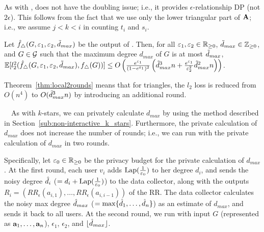 As with ,  does not have the doubling issue; i.e., it provides $\epsilon$-relationship DP (not $2\epsilon$). 
This follows from the fact that we 
use only the lower triangular part of $\mathbf{A}$; 
i.e., we assume 
$j<k<i$ 
in counting $t_i$ and $s_i$. 

\begin{theorem}\label{thm:local2rounds}
  Let 
  $\hat{f}_{\triangle}(G, \varepsilon_1, \varepsilon_2, \tilde{d}_{max})$ 
  be the output of 
  . 
  Then, for all 
  $\varepsilon_1,\varepsilon_2 \in \mathbb{R}_{\ge0}$, 
  $\tilde{d}_{max} \in \mathbb{Z}_{\ge0}$,
  and $G\in \mathcal{G}$ such that the
  maximum degree $d_{max}$ of $G$ is 
  at most 
  $\tilde{d}_{max}$,
  $\mathbb{E}[l_2^2(\hat{f}_{\triangle}(G, \varepsilon_1, \varepsilon_2, \tilde{d}_{max}), f_\triangle(G))] 
  \leq
    O\left(\frac{e^{\varepsilon_1}}{(1-e^{\varepsilon_1})^2} \left(\tilde{d}_{max}^3 n +
    \frac{e^{\varepsilon_1}}{\varepsilon_2^2}\tilde{d}_{max}^2 n\right)\right)$.
\end{theorem}

Theorem~\ref{thm:local2rounds} means that for triangles, the $l_2$ loss 
is reduced from $O(n^4)$ to $O(\tilde{d}_{max}^3n)$ by introducing an additional round. 


\smallskip
{}~~As with $k$-stars, we can privately calculate $d_{max}$ 
by using the method described in Section~\ref{sub:non-interactive_k_stars}. 
Furthermore, the private calculation of $d_{max}$ does not increase the number of rounds; i.e., we can run  with the private calculation of $d_{max}$ in two rounds. 

Specifically, let $\varepsilon_0 \in \mathbb{R}_{\ge0}$ be the privacy budget for the private calculation of $d_{max}$. 
At the first round, each user $v_i$ adds $\textrm{Lap}(\frac{1}{\varepsilon_0})$ to her degree $d_i$, 
and sends the noisy degree $\hat{d}_i$ ($=d_i + \textrm{Lap}(\frac{1}{\varepsilon_0})$) to the data collector, along with the outputs $R_i = (RR_\epsilon(a_{i,1}), \ldots, RR_\epsilon(a_{i,i-1}))$ of the RR. 
The data collector calculates the noisy max degree $\hat{d}_{max}$ ($= \max\{\hat{d}_1,
\ldots, \hat{d}_n\}$) as an estimate of $d_{max}$, and sends it back to all users. 
At the second round, we run  with input $G$ (represented as $\mathbf{a}_1, \ldots, \mathbf{a}_n$), $\epsilon_1$, $\epsilon_2$, and $\lfloor \hat{d}_{max} \rfloor$. 


